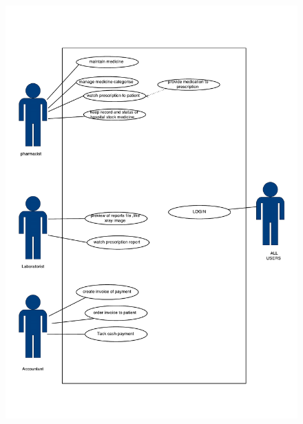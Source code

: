 \documentclass[14pt]{article}
\begin{document}
\begin{figure}[h!]
\centering
  \includegraphics[width=15cm]{hospitalDiagram-2.pdf}
\end{figure}
\end{document}
